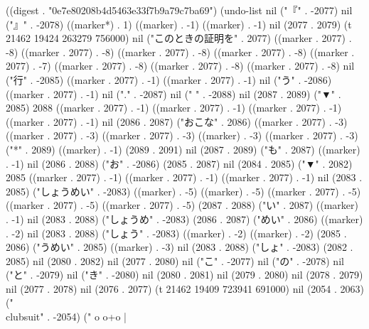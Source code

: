 
((digest . "0e7e80208b4d5463e33f7b9a79c7ba69") (undo-list nil ("『" . -2077) nil ("』" . -2078) ((marker*) . 1) ((marker) . -1) ((marker) . -1) nil (2077 . 2079) (t 21462 19424 263279 756000) nil ("このときの証明を" . 2077) ((marker . 2077) . -8) ((marker . 2077) . -8) ((marker . 2077) . -8) ((marker . 2077) . -8) ((marker . 2077) . -7) ((marker . 2077) . -8) ((marker . 2077) . -8) ((marker . 2077) . -8) nil ("行" . -2085) ((marker . 2077) . -1) ((marker . 2077) . -1) nil ("う" . -2086) ((marker . 2077) . -1) nil ("." . -2087) nil (" " . -2088) nil (2087 . 2089) ("▼" . 2085) 2088 ((marker . 2077) . -1) ((marker . 2077) . -1) ((marker . 2077) . -1) ((marker . 2077) . -1) nil (2086 . 2087) ("おこな" . 2086) ((marker . 2077) . -3) ((marker . 2077) . -3) ((marker . 2077) . -3) ((marker) . -3) ((marker . 2077) . -3) ("*" . 2089) ((marker) . -1) (2089 . 2091) nil (2087 . 2089) ("も" . 2087) ((marker) . -1) nil (2086 . 2088) ("お" . -2086) (2085 . 2087) nil (2084 . 2085) ("▼" . 2082) 2085 ((marker . 2077) . -1) ((marker . 2077) . -1) ((marker . 2077) . -1) nil (2083 . 2085) ("しょうめい" . -2083) ((marker) . -5) ((marker) . -5) ((marker . 2077) . -5) ((marker . 2077) . -5) ((marker . 2077) . -5) (2087 . 2088) ("い" . 2087) ((marker) . -1) nil (2083 . 2088) ("しょうめ" . -2083) (2086 . 2087) ("めい" . 2086) ((marker) . -2) nil (2083 . 2088) ("しょう" . -2083) ((marker) . -2) ((marker) . -2) (2085 . 2086) ("うめい" . 2085) ((marker) . -3) nil (2083 . 2088) ("しょ" . -2083) (2082 . 2085) nil (2080 . 2082) nil (2077 . 2080) nil ("こ" . -2077) nil ("の" . -2078) nil ("と" . -2079) nil ("き" . -2080) nil (2080 . 2081) nil (2079 . 2080) nil (2078 . 2079) nil (2077 . 2078) nil (2076 . 2077) (t 21462 19409 723941 691000) nil (2054 . 2063) ("\\clubsuit" . -2054) (" o
o+o
 |
